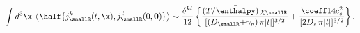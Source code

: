 \begin{equation}
  \int d^3\x \>
  \left\langle
      \half \{ j_\smallR^k(t,\x), j_\smallR^{\,l}(0,{\bf 0}) \}
  \right\rangle
  \sim
  \frac{\delta^{kl} }{ 12 }
  \left\{
      \frac{(T/\bar\enthalpy) \, \chi_\smallR}
	  {[(D_{\smallR} {+} \gamma_\eta) \, \pi |t|]^{3/2}}
      + \frac{\coeff 14 c_s^2  }{ [2D_{s} \, \pi |t|]^{3/2}}
  \right\} .
\end{equation}

